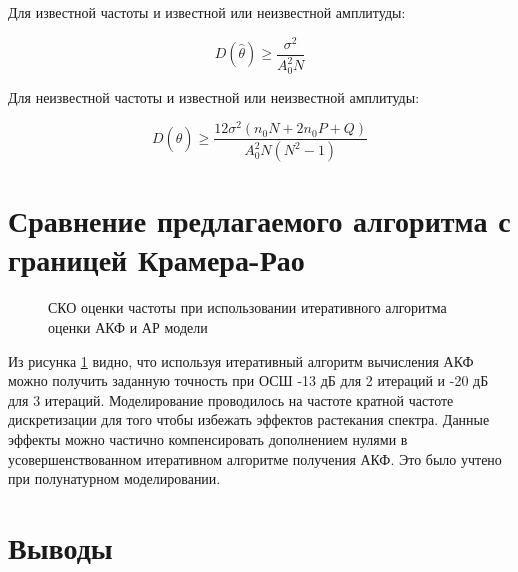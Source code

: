 Для известной частоты и известной или неизвестной амплитуды:
\begin{center}
\begin{equation}
	\label{eq:clrb_est_b_1}
	D(\hat{\theta}) \ge \frac{\sigma^2}{A_0^2N}
\end{equation}
\end{center}

Для неизвестной частоты и известной или неизвестной амплитуды:
\begin{center}
\begin{equation}
	\label{eq:clrb_est_b_1}
	D(\hat{\theta}) \ge \frac{12\sigma^2(n_0N + 2n_0P + Q)}{A_0^2N(N^2-1)}
\end{equation}
\end{center}

\section{Сравнение предлагаемого алгоритма с границей Крамера-Рао}
\begin{figure}[h]
\center{}
	\caption{СКО оценки частоты при использовании итеративного алгоритма оценки АКФ и АР модели}
	\label{pic:crlb_vs_algorithm}
\end{figure}

Из рисунка \ref{pic:crlb_vs_algorithm} видно, что используя итеративный алгоритм вычисления АКФ можно получить заданную точность
при ОСШ -13 дБ для 2 итераций и -20 дБ для 3 итераций. Моделирование проводилось на частоте кратной частоте дискретизации для
того чтобы избежать эффектов растекания спектра. Данные эффекты можно частично компенсировать дополнением нулями в
усовершенствованном итеративном алгоритме получения АКФ. Это было учтено при полунатурном моделировании.

\section{Выводы}

